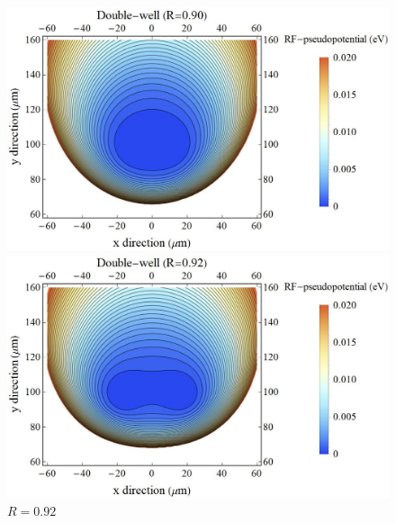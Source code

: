 \begin{figure}[h]
	\begin{minipage}{0.48\linewidth}
		\begin{center}
			\includegraphics[width = 0.9\columnwidth]{./simulation/figure/rf_pseudopotential_R=090.jpg}
			\caption{$R=0.90$}
			\label{fig:R090}
		\end{center}
	\end{minipage}
	\begin{minipage}{0.48\linewidth}
			\begin{center}
				\includegraphics[width = 0.9\columnwidth]{./simulation/figure/rf_pseudopotential_R=092.jpg}
				\caption{$R=0.92$}
				\label{fig:R092}
			\end{center}
		\end{minipage}
\end{figure}
